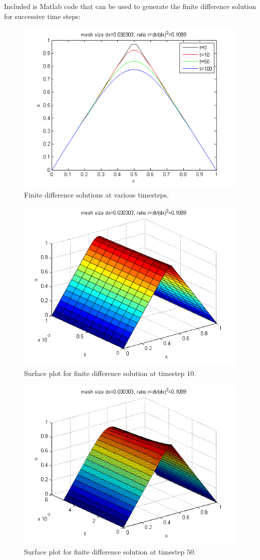 \begin{solution}
\begin{enumerate}
Included is Matlab code that can be used to generate the finite difference solution for successive time steps:

\begin{figure}
\centering
\includegraphics[width=.8\textwidth]{p4a_sol.png}
\caption{Finite difference solutions at various timesteps.}
\end{figure}
\begin{figure}
\centering
\includegraphics[width=.8\textwidth]{p4a_surf10.png}
\caption{Surface plot for finite difference solution at timestep $10$.}
\end{figure}

\begin{figure}
\centering
\includegraphics[width=.8\textwidth]{p4a_surf50.png}
\caption{Surface plot for finite difference solution at timestep $50$.}
\end{figure}


\end{enumerate}
\end{solution}
